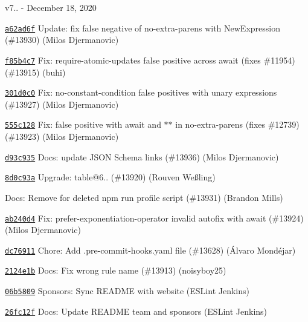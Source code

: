 v7.. -\/ December 18, 2020


\begin{DoxyItemize}
\item \href{https://github.com/eslint/eslint/commit/a62ad6f03151358b93b5fede022a30d67310705c}{\texttt{ {\ttfamily a62ad6f}}} Update\+: fix false negative of no-\/extra-\/parens with New\+Expression (\#13930) (Milos Djermanovic)
\item \href{https://github.com/eslint/eslint/commit/f85b4c72668c95c79fdb342b74dbd53d21baa93f}{\texttt{ {\ttfamily f85b4c7}}} Fix\+: require-\/atomic-\/updates false positive across await (fixes \#11954) (\#13915) (buhi)
\item \href{https://github.com/eslint/eslint/commit/301d0c05229dbd6cfb1045d716524e8ec46fa2c1}{\texttt{ {\ttfamily 301d0c0}}} Fix\+: no-\/constant-\/condition false positives with unary expressions (\#13927) (Milos Djermanovic)
\item \href{https://github.com/eslint/eslint/commit/555c128b49ae6d9c100a9f8429416417edb40d13}{\texttt{ {\ttfamily 555c128}}} Fix\+: false positive with await and \texorpdfstring{$\ast$}{*}\texorpdfstring{$\ast$}{*} in no-\/extra-\/parens (fixes \#12739) (\#13923) (Milos Djermanovic)
\item \href{https://github.com/eslint/eslint/commit/d93c9350361d2aa1a1976c553e47ab399e51e8c9}{\texttt{ {\ttfamily d93c935}}} Docs\+: update JSON Schema links (\#13936) (Milos Djermanovic)
\item \href{https://github.com/eslint/eslint/commit/8d0c93a7ef9449c7b7d082bbb4b7d8465b0d6bac}{\texttt{ {\ttfamily 8d0c93a}}} Upgrade\+: table@6.. (\#13920) (Rouven Weßling)
\item \href{https://github.com/eslint/eslint/commit/924768377a4935a95a6ff3866f9545a5a6178b53}{\texttt{ {}}} Docs\+: Remove for deleted npm run profile script (\#13931) (Brandon Mills)
\item \href{https://github.com/eslint/eslint/commit/ab240d49833b4e6e594667c1abe5b0caa8a9cf70}{\texttt{ {\ttfamily ab240d4}}} Fix\+: prefer-\/exponentiation-\/operator invalid autofix with await (\#13924) (Milos Djermanovic)
\item \href{https://github.com/eslint/eslint/commit/dc7691103554a99bdb2142561cb507f50f547e3b}{\texttt{ {\ttfamily dc76911}}} Chore\+: Add .pre-\/commit-\/hooks.\+yaml file (\#13628) (Álvaro Mondéjar)
\item \href{https://github.com/eslint/eslint/commit/2124e1b5dad30a905dc26bde9da472bf622d3f50}{\texttt{ {\ttfamily 2124e1b}}} Docs\+: Fix wrong rule name (\#13913) (noisyboy25)
\item \href{https://github.com/eslint/eslint/commit/06b58096975935ec016d96dd5f333f059c270f26}{\texttt{ {\ttfamily 06b5809}}} Sponsors\+: Sync README with website (ESLint Jenkins)
\item \href{https://github.com/eslint/eslint/commit/26fc12f88109af9d4081bf0e16364c411bce3009}{\texttt{ {\ttfamily 26fc12f}}} Docs\+: Update README team and sponsors (ESLint Jenkins)
\end{DoxyItemize}

